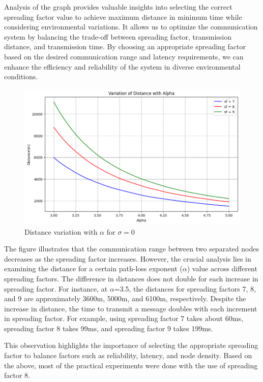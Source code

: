 Analysis of the graph provides valuable insights into selecting the correct spreading factor value to achieve maximum distance in minimum time while considering environmental variations. It allows us to optimize the communication system by balancing the trade-off between spreading factor, transmission distance, and transmission time. By choosing an appropriate spreading factor based on the desired communication range and latency requirements, we can enhance the efficiency and reliability of the system in diverse environmental conditions.
            \begin{figure}
                \centering
                \includegraphics[width=0.7\columnwidth]{images/sigmazero.jpg}
                \caption{Distance variation with $\alpha$ for $\sigma=0$}
                \label{fig:enter-label}
            \end{figure}

The figure illustrates that the communication range between two separated nodes decreases as the spreading factor increases. However, the crucial analysis lies in examining the distance for a certain path-loss exponent ($\alpha$) value across different spreading factors. The difference in distances does not double for each increase in spreading factor. For instance, at $\alpha$=3.5, the distances for spreading factors 7, 8, and 9 are approximately 3600m, 5000m, and 6100m, respectively. Despite the increase in distance, the time to transmit a message doubles with each increment in spreading factor. For example, using spreading factor 7 takes about 60ms, spreading factor 8 takes 99ms, and spreading factor 9 takes 199ms.

This observation highlights the importance of selecting the appropriate spreading factor to balance factors such as reliability, latency, and node density. Based on the above, most of the practical experiments were done with the use of spreading factor 8.\\



